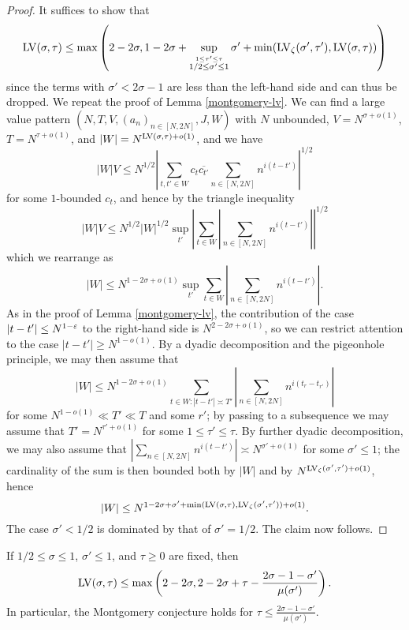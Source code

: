 \begin{proof} It suffices to show that
    $$ \mathrm{LV}(\sigma,\tau) \leq \max\left(2-2\sigma, 1 - 2\sigma + \sup_{\stackrel{1 \leq \tau' \leq \tau}{1/2 \leq \sigma' \leq 1}}  \sigma' + \min(\mathrm{LV}_\zeta(\sigma',\tau'), \mathrm{LV}(\sigma,\tau)) \right)$$
    since the terms with $\sigma' < 2\sigma-1$ are less than the left-hand side and can thus be dropped.
    We repeat the proof of Lemma \ref{montgomery-lv}.  We can find a large value pattern $(N,T,V,(a_n)_{n \in [N,2N]},J,W)$ with $N$ unbounded, $V = N^{\sigma+o(1)}$, $T = N^{\tau+o(1)}$, and $|W| = N^{\mathrm{LV}(\sigma,\tau)+o(1)}$, and we have
    $$ |W|V \leq N^{1/2} \left|\sum_{t,t' \in W} c_t \overline{c_{t'}} \sum_{n \in [N,2N]} n^{i(t-t')} \right|^{1/2}$$
    for some $1$-bounded $c_t$, and hence by the triangle inequality
    $$ |W|V \leq N^{1/2} |W|^{1/2} \sup_{t'} \left|\sum_{t \in W} |\sum_{n \in [N,2N]} n^{i(t-t')}| \right|^{1/2}$$
    which we rearrange as
    $$ |W| \leq N^{1-2\sigma+o(1)} \sup_{t'} \sum_{t \in W} |\sum_{n \in [N,2N]} n^{i(t-t')}|.$$
    As in the proof of Lemma \ref{montgomery-lv}, the contribution of the case $|t - t'| \leq N^{1-\varepsilon}$ to the right-hand side is $N^{2-2\sigma+o(1)}$, so we can restrict attention to the case $|t - t'| \geq N^{1-o(1)}$.  By a dyadic decomposition and the pigeonhole principle, we may then assume that
    $$ |W| \leq N^{1-2\sigma+o(1)} \sum_{t \in W: |t - t'| \asymp T'} |\sum_{n \in [N,2N]} n^{i(t_r-t_{r'})}|$$
    for some $N^{1-o(1)} \ll T' \ll T$ and some $r'$; by passing to a subsequence we may assume that $T' = N^{\tau'+o(1)}$ for some $1 \leq \tau' \leq \tau$.  By further dyadic decomposition, we may also assume that
    $ |\sum_{n \in [N,2N]} n^{i(t-t')}| \asymp N^{\sigma'+o(1)}$
    for some $\sigma' \leq 1$; the cardinality of the sum is then bounded both by $|W|$ and by $N^{\mathrm{LV}_\zeta(\sigma',\tau') + o(1)}$,
    hence
    $$ |W| \leq N^{1-2\sigma+\sigma' + \min( \mathrm{LV}(\sigma,\tau), \mathrm{LV}_\zeta(\sigma',\tau') ) + o(1)}.$$
    The case $\sigma' < 1/2$ is dominated by that of $\sigma'=1/2$.  The claim now follows.
\end{proof}

\begin{corollary}\label{mu-lv}  If $1/2 \leq \sigma \leq 1$, $\sigma' \leq 1$, and $\tau \geq 0$ are fixed, then
    $$\mathrm{LV}(\sigma,\tau) \leq \max\left( 2-2\sigma, 2 - 2\sigma + \tau - \frac{2\sigma-1-\sigma'}{\mu(\sigma')} \right).$$
    In particular, the Montgomery conjecture holds for $\tau \leq \frac{2\sigma-1-\sigma'}{\mu(\sigma')}$.
\end{corollary}

